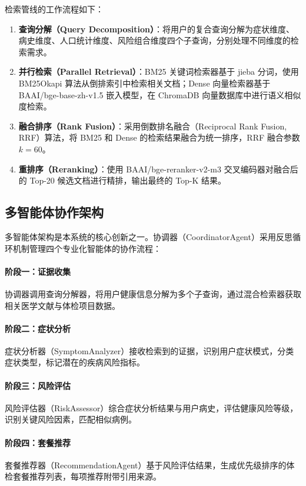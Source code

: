 \documentclass[12pt,a4paper]{article}
\begin{document}
检索管线的工作流程如下：

\begin{enumerate}[leftmargin=2em]
    \item \textbf{查询分解（Query Decomposition）}：将用户的复合查询分解为症状维度、病史维度、人口统计维度、风险组合维度四个子查询，分别处理不同维度的检索需求。
    \item \textbf{并行检索（Parallel Retrieval）}：BM25 关键词检索器基于 jieba 分词，使用 BM25Okapi 算法从倒排索引中检索相关文档；Dense 向量检索器基于 BAAI/bge-base-zh-v1.5 嵌入模型，在 ChromaDB 向量数据库中进行语义相似度检索。
    \item \textbf{融合排序（Rank Fusion）}：采用倒数排名融合（Reciprocal Rank Fusion, RRF）算法，将 BM25 和 Dense 的检索结果融合为统一排序，RRF 融合参数 $k=60$。
    \item \textbf{重排序（Reranking）}：使用 BAAI/bge-reranker-v2-m3 交叉编码器对融合后的 Top-20 候选文档进行精排，输出最终的 Top-K 结果。
\end{enumerate}

\subsection{多智能体协作架构}

多智能体架构是本系统的核心创新之一。协调器（CoordinatorAgent）采用反思循环机制管理四个专业化智能体的协作流程：

\paragraph{阶段一：证据收集}
协调器调用查询分解器，将用户健康信息分解为多个子查询，通过混合检索器获取相关医学文献与体检项目数据。

\paragraph{阶段二：症状分析}
症状分析器（SymptomAnalyzer）接收检索到的证据，识别用户症状模式，分类症状类型，标记潜在的疾病风险指标。

\paragraph{阶段三：风险评估}
风险评估器（RiskAssessor）综合症状分析结果与用户病史，评估健康风险等级，识别关键风险因素，匹配相似病例。

\paragraph{阶段四：套餐推荐}
套餐推荐器（RecommendationAgent）基于风险评估结果，生成优先级排序的体检套餐推荐列表，每项推荐附带引用来源。
\end{document}
